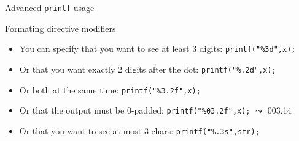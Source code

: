 \begin{Coupe}
\begin{frame}{Advanced \texttt{printf} usage}
  \begin{block}{Formating directive modifiers} 
    \begin{itemize}
    \item You can specify that you want to see at least 3 digits:
      \texttt{printf("\%3d",x);}
    \item Or that you want exactly 2 digits after the dot: \texttt{printf("\%.2d",x);}
    \item Or both at the same time: \texttt{printf("\%3.2f",x);}
    \item Or that the output must be 0-padded: \texttt{printf("\%03.2f",x);}
      $\leadsto$ 003.14
    \item Or that you want to see at most 3 chars: \texttt{printf("\%.3s",str);}

    \end{itemize}
  \end{block}


\end{frame}
\end{Coupe}
